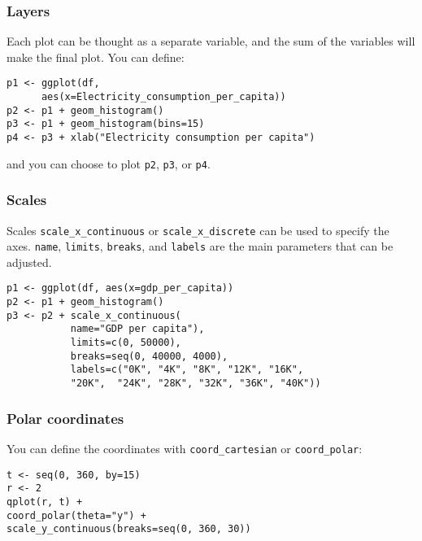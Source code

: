 \documentclass{beamer}
\begin{document}
	\begin{frame}[fragile]
		\frametitle{Layers}

		Each plot can be thought as a separate variable, and the sum of the variables will make the final plot. You can define:

		\vspace{2em}

		\begin{exampleblock}{}
		\begin{BVerbatim}
p1 <- ggplot(df,
      aes(x=Electricity_consumption_per_capita))
p2 <- p1 + geom_histogram()
p3 <- p1 + geom_histogram(bins=15)
p4 <- p3 + xlab("Electricity consumption per capita")
		\end{BVerbatim}
		\end{exampleblock}{}

		\vspace{2em}

		and you can choose to plot \verb|p2|, \verb|p3|, or \verb|p4|.

	\end{frame}

	\begin{frame}[fragile]
		\frametitle{Scales}

		Scales \verb|scale_x_continuous| or \verb|scale_x_discrete| can be used to specify the axes. \verb|name|, \verb|limits|, \verb|breaks|, and \verb|labels| are the main parameters that can be adjusted.

		\vspace{2em}

		\begin{exampleblock}{}
		\begin{BVerbatim}
p1 <- ggplot(df, aes(x=gdp_per_capita))
p2 <- p1 + geom_histogram()
p3 <- p2 + scale_x_continuous(
           name="GDP per capita"),
           limits=c(0, 50000),
           breaks=seq(0, 40000, 4000),
           labels=c("0K", "4K", "8K", "12K", "16K",
           "20K",  "24K", "28K", "32K", "36K", "40K"))
		\end{BVerbatim}
		\end{exampleblock}{}

	\end{frame}

	\begin{frame}[fragile]
		\frametitle{Polar coordinates}

		You can define the coordinates with \verb|coord_cartesian| or \verb|coord_polar|:

		\vspace{2em}

		\begin{exampleblock}{}
		\begin{BVerbatim}
t <- seq(0, 360, by=15)
r <- 2
qplot(r, t) +
coord_polar(theta="y") +
scale_y_continuous(breaks=seq(0, 360, 30))
		\end{BVerbatim}
		\end{exampleblock}{}

	\end{frame}
\end{document}
